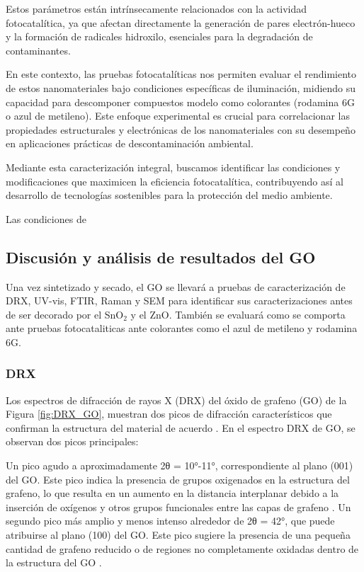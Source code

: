 \documentclass[12pt]{article}
\begin{document}
Estos parámetros están intrínsecamente relacionados con la actividad fotocatalítica, ya que afectan directamente la generación de pares electrón-hueco y la formación de radicales hidroxilo, esenciales para la degradación de contaminantes.\vspace{1em} %

En este contexto, las pruebas fotocatalíticas nos permiten evaluar el rendimiento de estos nanomateriales bajo condiciones específicas de iluminación, midiendo su capacidad para descomponer compuestos modelo como colorantes (rodamina 6G o azul de metileno). Este enfoque experimental es crucial para correlacionar las propiedades estructurales y electrónicas de los nanomateriales con su desempeño en aplicaciones prácticas de descontaminación ambiental.\vspace{1em} %

Mediante esta caracterización integral, buscamos identificar las condiciones y modificaciones que maximicen la eficiencia fotocatalítica, contribuyendo así al desarrollo de tecnologías sostenibles para la protección del medio ambiente.

Las condiciones de 

\subsection{Discusión y análisis de resultados del GO}
Una vez sintetizado y secado, el GO se llevará a pruebas de caracterización de DRX, UV-vis, FTIR, Raman y SEM para identificar sus caracterizaciones antes de ser decorado por el SnO$\displaystyle _{2}$ y el ZnO. También se evaluará como se comporta ante pruebas fotocataliticas ante colorantes como el azul de metileno y rodamina 6G.
\subsubsection{DRX}
Los espectros de difracción de rayos X (DRX) del óxido de grafeno (GO) de la Figura \ref{fig:DRX_GO}, muestran dos picos de difracción característicos que confirman la estructura del material de acuerdo \cite{IEEEreferencias:GO_3}. En el espectro DRX de GO, se observan dos picos principales:
\vspace{1em} %

Un pico agudo a aproximadamente 2θ = 10°-11°, correspondiente al plano (001) del GO. Este pico indica la presencia de grupos oxigenados en la estructura del grafeno, lo que resulta en un aumento en la distancia interplanar debido a la inserción de oxígenos y otros grupos funcionales entre las capas de grafeno \cite{IEEEreferencias:GO_2}.
Un segundo pico más amplio y menos intenso alrededor de 2θ = 42°, que puede atribuirse al plano (100) del GO. Este pico sugiere la presencia de una pequeña cantidad de grafeno reducido o de regiones no completamente oxidadas dentro de la estructura del GO \cite{IEEEreferencias:GO_3}.
\vspace{1em} %
\end{document}
